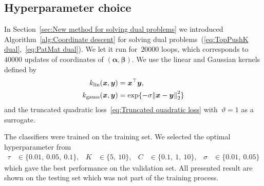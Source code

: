 \subsection{Hyperparameter choice}

In Section~\ref{sec:New method for solving dual problems} we introduced Algorithm~\ref{alg:Coordinate descent} for solving dual problems~(\ref{eq:TopPushK dual},~\ref{eq:PatMat dual}). We let it run for~$20000$ \repeatloop loops, which corresponds to~$40000$ updates of coordinates of $(\bm{\alpha},\bm{\beta})$. We use the linear and Gaussian kernels defined by
\begin{align}
  k_{\textrm{lin}}(\bm{x}, \bm{y})   & = \bm{x}^{\top} \bm{y}, \label{eq:Linear kernel} \\
  k_{\textrm{gauss}}(\bm{x}, \bm{y}) & = \exp\{-\sigma \norm{\bm{x} - \bm{y}}_2^2\} \label{eq:Gaussian kernel}
\end{align}
and the truncated quadratic loss~\eqref{eq:Truncated quadratic loss} with~$\vartheta = 1$ as a surrogate. 

The classifiers were trained on the training set. We selected the optimal hyperparameter from
\begin{equation*}
  \begin{aligned}
    \tau   & \in \{0.01,\ 0.05,\ 0.1\}, &
    K      & \in \{5,\ 10\}, &
    C      & \in \{0.1,\ 1,\ 10\}, &
    \sigma & \in \{0.01,\ 0.05\} 
  \end{aligned}
\end{equation*}
which gave the best performance on the validation set. All presented result are shown on the testing set which was not part of the training process.


